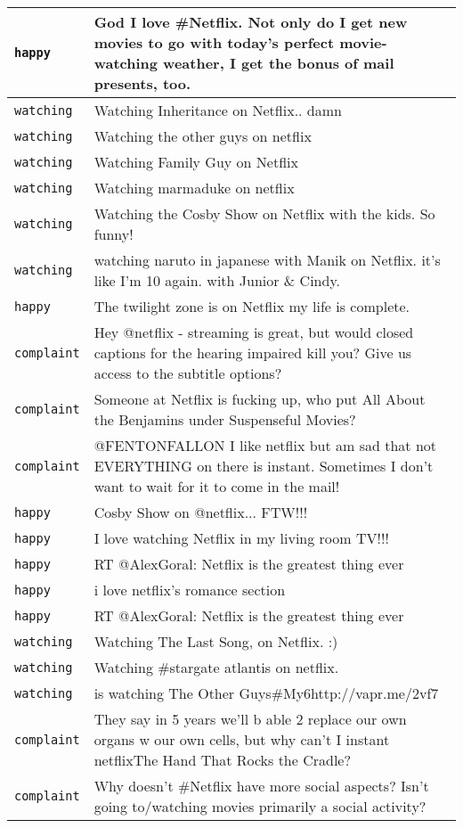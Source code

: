 \begin{center}
\begin{longtable}{|l|p{120mm}|}
         \texttt{happy} & God I love \#Netflix. Not only do I get new movies to go with today's perfect movie-watching weather, I get the bonus of mail presents, too.
      \tabularnewline\hline
         \texttt{watching} & Watching Inheritance on Netflix.. damn
      \tabularnewline\hline
         \texttt{watching} & Watching the other guys on netflix
      \tabularnewline\hline
         \texttt{watching} & Watching Family Guy on Netflix
      \tabularnewline\hline
         \texttt{watching} & Watching marmaduke on netflix
      \tabularnewline\hline
         \texttt{watching} & Watching the Cosby Show on Netflix with the kids. So funny!
      \tabularnewline\hline
         \texttt{watching} & watching naruto in japanese with Manik on Netflix. it's like I'm 10 again. with Junior \& Cindy.
      \tabularnewline\hline
         \texttt{happy} & The twilight zone is on Netflix my life is complete.
      \tabularnewline\hline
         \texttt{complaint} & Hey @netflix - streaming is great, but would closed captions for the hearing impaired kill you? Give us access to the subtitle options?
      \tabularnewline\hline
         \texttt{complaint} & Someone at Netflix is fucking up, who put All About the Benjamins under Suspenseful Movies?
      \tabularnewline\hline
         \texttt{complaint} & @FENTONFALLON I like netflix but am sad that not EVERYTHING on there is instant. Sometimes I don't want to wait for it to come in the mail!
      \tabularnewline\hline
         \texttt{happy} & Cosby Show on @netflix... FTW!!!
      \tabularnewline\hline
         \texttt{happy} & I love watching Netflix in my living room TV!!!
      \tabularnewline\hline
         \texttt{happy} & RT @AlexGoral: Netflix is the greatest thing ever
      \tabularnewline\hline
         \texttt{happy} & i love netflix's romance section
      \tabularnewline\hline
         \texttt{happy} & RT @AlexGoral: Netflix is the greatest thing ever
      \tabularnewline\hline
         \texttt{watching} & Watching The Last Song, on Netflix. :)
      \tabularnewline\hline
         \texttt{watching} & Watching \#stargate atlantis on netflix.
      \tabularnewline\hline
         \texttt{watching} & is watching The Other Guys\#My6http://vapr.me/2vf7
      \tabularnewline\hline
         \texttt{complaint} & They say in 5 years we'll b able 2 replace our own organs w our own cells, but why can't I instant netflixThe Hand That Rocks the Cradle?
      \tabularnewline\hline
         \texttt{complaint} & Why doesn't \#Netflix have more social aspects? Isn't going to/watching movies primarily a social activity?
      \tabularnewline\hline

\end{longtable}
\end{center}
